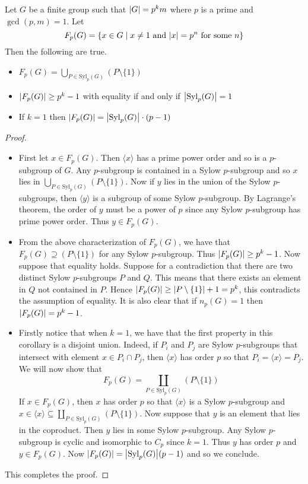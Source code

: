 \documentclass[a4paper]{article}
\begin{document}
\begin{crl}{}{} Let $G$ be a finite group such that $\abs{G}=p^km$ where $p$ is a prime and $\gcd(p,m)=1$. Let $$F_p(G)=\{x\in G\;|\;x\neq 1\text{ and }\abs{x}=p^n\text{ for some }n\}$$ Then the following are true. 
\begin{itemize}
\item $F_p(G)=\bigcup_{P\in\text{Syl}_p(G)}(P\setminus\{1\})$
\item $\abs{F_p(G)}\geq p^k-1$ with equality if and only if $\abs{\text{Syl}_p(G)}=1$
\item If $k=1$ then $\abs{F_p(G)}=\abs{\text{Syl}_p(G)}\cdot(p-1)$
\end{itemize} 
\begin{proof}~\\
\begin{itemize}
\item First let $x\in F_p(G)$. Then $\langle x\rangle$ has a prime power order and so is a $p$-subgroup of $G$. Any $p$-subgroup is contained in a Sylow $p$-subgroup and so $x$ lies in $\bigcup_{P\in\text{Syl}_p(G)}(P\setminus\{1\})$. Now if $y$ lies in the union of the Sylow $p$-subgroups, then $\langle y\rangle$ is a subgroup of some Sylow $p$-subgroup. By Lagrange's theorem, the order of $y$ must be a power of $p$ since any Sylow $p$-subgroup has prime power order. Thus $y\in F_p(G)$. 

\item From the above characterization of $F_p(G)$, we have that $F_p(G)\supseteq(P\setminus\{1\})$ for any Sylow $p$-subgroup. Thus $\abs{F_p(G)}\geq p^k-1$. Now suppose that equality holds. Suppose for a contradiction that there are two distinct Sylow $p$-subgroups $P$ and $Q$. This means that there exists an element in $Q$ not contained in $P$. Hence $\abs{F_p(G)}\geq\abs{P\setminus\{1\}}+1=p^k$, this contradicts the assumption of equality. It is also clear that if $n_p(G)=1$ then $\abs{F_p(G)}=p^k-1$. 

\item Firstly notice that when $k=1$, we have that the first property in this corollary is a disjoint union. Indeed, if $P_i$ and $P_j$ are Sylow $p$-subgroups that intersect with element $x\in P_i\cap P_j$, then $\langle x\rangle$ has order $p$ so that $P_i=\langle x\rangle=P_j$. \\

We will now show that $$F_p(G)=\coprod_{P\in\text{Syl}_p(G)}(P\setminus\{1\})$$ If $x\in F_p(G)$, then $x$ has order $p$ so that $\langle x\rangle$ is a Sylow $p$-subgroup and $x\in\langle x\rangle\subseteq\coprod_{P\in\text{Syl}_p(G)}(P\setminus\{1\})$. Now suppose that $y$ is an element that lies in the coproduct. Then $y$ lies in some Sylow $p$-subgroup. Any Sylow $p$-subgroup is cyclic and isomorphic to $C_p$ since $k=1$. Thus $y$ has order $p$ and $y\in F_p(G)$. Now $\abs{F_p(G)}=\abs{\text{Syl}_p(G)}(p-1)$ and so we conclude. 
\end{itemize}
This completes the proof. 
\end{proof}
\end{crl}
\end{document}
